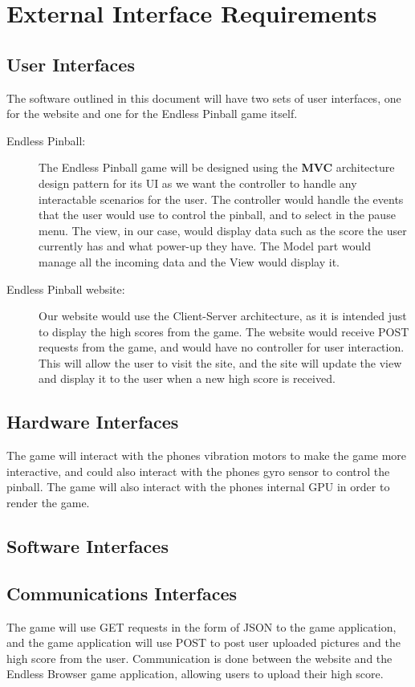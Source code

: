 \documentclass[11pt]{article}
\begin{document}
\section{External Interface Requirements}
\label{sec:orgc631535}
\subsection{User Interfaces}
\label{sec:org7904af6}
The software outlined in this document will have two sets of user interfaces, one for the website and one for the Endless Pinball game itself. 
\begin{description}
\item[{Endless Pinball:}] The Endless Pinball game will be designed using the \textbf{MVC} architecture design pattern for its UI as we want the controller to handle any interactable scenarios for the user. The controller would handle the events that the user would use to control the pinball, and to select in the pause menu. The view, in our case, would display data such as the score the user currently has and what power-up they have. The Model part would manage all the incoming data and the View would display it.
\item[{Endless Pinball website:}] Our website would use the Client-Server architecture, as it is intended just to display the high scores from the game. The website would receive POST requests from the game, and would have no controller for user interaction. This will allow the user to visit the site, and the site will update the view and display it to the user when a new high score is received.
\end{description}
\subsection{Hardware Interfaces}
\label{sec:org1316e46}
The game will interact with the phones vibration motors to make the game more interactive, and could also interact with the phones gyro sensor to control the pinball. The game will also interact with the phones internal GPU in order to render the game. 
\subsection{Software Interfaces}
\label{sec:org800a726}
\subsection{Communications Interfaces}
\label{sec:orgddde17a}
The game will use GET requests in the form of JSON to the game application,
and the game application will use POST to post user uploaded pictures and the high score from the user. Communication is done between the website
and the Endless Browser game application, allowing users to upload their high score. 
\end{document}
